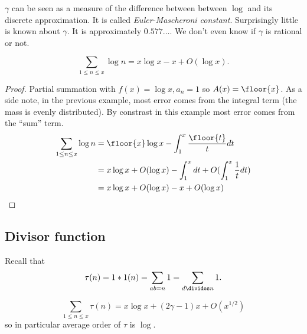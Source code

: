 \documentclass[a4paper]{article}
\theoremstyle{definition}
\begin{document}
\(\gamma\) can be seen as a measure of the difference between between \(\log\) and its discrete approximation. It is called \emph{Euler-Mascheroni constant}.
Surprisingly little is known about \(\gamma\). It is approximately \(0.577\dots\). We don't even know if \(\gamma\) is rational or not.

\begin{lemma}
  \[
    \sum_{1 \leq n \leq x} \log n = x \log x - x + O(\log x).
  \]
\end{lemma}

\begin{proof}
  Partial summation with \(f(x) = \log x, a_n = 1\) so \(A(x) = \floor{x}\). As a side note, in the previous example, most error comes from the integral term (the mass is evenly distributed). By constrast in this example most error comes from the ``sum'' term.
  \begin{align*}
    \sum_{1 \leq n \leq x} \log n
    &= \floor{x} \log x - \int_1^x \frac{\floor{t}}{t} dt \\
    &= x \log x + O(\log x) - \int_1^x dt + O(\int_1^x \frac{1}{t}dt) \\
    &= x \log x + O(\log x) - x + O(\log x)
  \end{align*}
\end{proof}

\subsection{Divisor function}

Recall that
\[
  \tau(n) = 1 * 1(n) = \sum_{ab = n} 1 = \sum_{d \divides n} 1.
\]

\begin{theorem}
  \[
    \sum_{1 \leq n \leq x} \tau(n) = x \log x + (2 \gamma - 1) x + O(x^{1/2})
  \]
  so in particular average order of \(\tau\) is \(\log\).
\end{theorem}
\end{document}
